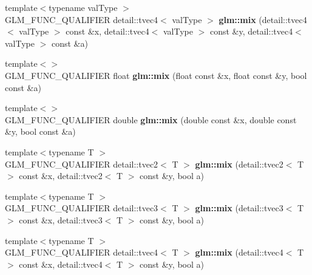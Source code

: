 \begin{DoxyCompactItemize}
\item 
\hypertarget{namespaceglm_ac2db0b8c0d08f1abc8494d711b4468ec}{}{\footnotesize template$<$typename val\+Type $>$ }\\G\+L\+M\+\_\+\+F\+U\+N\+C\+\_\+\+Q\+U\+A\+L\+I\+F\+I\+E\+R detail\+::tvec4$<$ val\+Type $>$ {\bfseries glm\+::mix} (detail\+::tvec4$<$ val\+Type $>$ const \&x, detail\+::tvec4$<$ val\+Type $>$ const \&y, detail\+::tvec4$<$ val\+Type $>$ const \&a)\label{namespaceglm_ac2db0b8c0d08f1abc8494d711b4468ec}

\item 
\hypertarget{namespaceglm_a889c351d92dfe5e4e165757a350ae0a3}{}{\footnotesize template$<$$>$ }\\G\+L\+M\+\_\+\+F\+U\+N\+C\+\_\+\+Q\+U\+A\+L\+I\+F\+I\+E\+R float {\bfseries glm\+::mix} (float const \&x, float const \&y, bool const \&a)\label{namespaceglm_a889c351d92dfe5e4e165757a350ae0a3}

\item 
\hypertarget{namespaceglm_a68433084a3cf037788c978f4022c2b12}{}{\footnotesize template$<$$>$ }\\G\+L\+M\+\_\+\+F\+U\+N\+C\+\_\+\+Q\+U\+A\+L\+I\+F\+I\+E\+R double {\bfseries glm\+::mix} (double const \&x, double const \&y, bool const \&a)\label{namespaceglm_a68433084a3cf037788c978f4022c2b12}

\item 
\hypertarget{namespaceglm_aa7c2ef84c97b3716d59c649e0d539ff4}{}{\footnotesize template$<$typename T $>$ }\\G\+L\+M\+\_\+\+F\+U\+N\+C\+\_\+\+Q\+U\+A\+L\+I\+F\+I\+E\+R detail\+::tvec2$<$ T $>$ {\bfseries glm\+::mix} (detail\+::tvec2$<$ T $>$ const \&x, detail\+::tvec2$<$ T $>$ const \&y, bool a)\label{namespaceglm_aa7c2ef84c97b3716d59c649e0d539ff4}

\item 
\hypertarget{namespaceglm_a65752b0095482d66f97b92411104e0af}{}{\footnotesize template$<$typename T $>$ }\\G\+L\+M\+\_\+\+F\+U\+N\+C\+\_\+\+Q\+U\+A\+L\+I\+F\+I\+E\+R detail\+::tvec3$<$ T $>$ {\bfseries glm\+::mix} (detail\+::tvec3$<$ T $>$ const \&x, detail\+::tvec3$<$ T $>$ const \&y, bool a)\label{namespaceglm_a65752b0095482d66f97b92411104e0af}

\item 
\hypertarget{namespaceglm_a90f6db92fb85b364ccbe96ce096b8c28}{}{\footnotesize template$<$typename T $>$ }\\G\+L\+M\+\_\+\+F\+U\+N\+C\+\_\+\+Q\+U\+A\+L\+I\+F\+I\+E\+R detail\+::tvec4$<$ T $>$ {\bfseries glm\+::mix} (detail\+::tvec4$<$ T $>$ const \&x, detail\+::tvec4$<$ T $>$ const \&y, bool a)\label{namespaceglm_a90f6db92fb85b364ccbe96ce096b8c28}


\end{DoxyCompactItemize}
